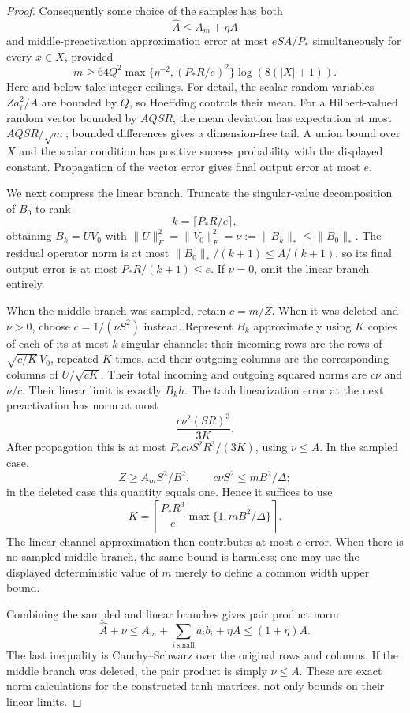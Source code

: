 \begin{proof}
Consequently some choice of the samples has both
\[
 \widehat A\le A_m+\eta A
\]
and middle-preactivation approximation error at most $eSA/P_*$
simultaneously for every $x\in X$, provided
\[
 m\ge64Q^2\max\{\eta^{-2},(P_*R/e)^2\}
                       \log(8(|X|+1)).
\]
Here and below take integer ceilings. For detail, the scalar random
variables $Za_i^2/A$ are bounded by $Q$, so Hoeffding controls their
mean. For a Hilbert-valued random vector bounded by $AQSR$, the mean
deviation has expectation at most $AQSR/\sqrt m$; bounded differences
gives a dimension-free tail. A union bound over $X$ and the scalar
condition has positive success probability with the displayed constant.
Propagation of the vector error gives final output error at most $e$.

We next compress the linear branch. Truncate the singular-value
decomposition of $B_0$ to rank
\[
 k=\lceil P_*R/e\rceil,
\]
obtaining $B_k=UV_0$ with
$\|U\|_F^2=\|V_0\|_F^2=\nu:=\|B_k\|_*\le\|B_0\|_*$.
The residual operator norm is at most $\|B_0\|_* /(k+1)\le A/(k+1)$,
so its final output error is at most $P_*R/(k+1)\le e$.
If $\nu=0$, omit the linear branch entirely.

When the middle branch was sampled, retain $c=m/Z$. When it was
deleted and $\nu>0$, choose $c=1/(\nu S^2)$ instead.
Represent $B_k$ approximately using $K$ copies of each of its at most
$k$ singular channels: their incoming rows are the rows of
$\sqrt{c/K}\,V_0$, repeated $K$ times, and their outgoing columns are
the corresponding columns of $U/\sqrt{cK}$.
Their total incoming and outgoing squared norms are $c\nu$ and
$\nu/c$. Their linear limit is exactly $B_kh$.
The tanh linearization error at the next preactivation has norm at most
\[
 \frac{c\nu^2(SR)^3}{3K}.
\]
After propagation this is at most
$P_*c\nu S^2R^3/(3K)$, using $\nu\le A$.
In the sampled case,
\[
 Z\ge A_mS^2/B^2,
 \qquad c\nu S^2\le mB^2/\Delta;
\]
in the deleted case this quantity equals one. Hence it suffices to use
\[
 K=\left\lceil\frac{P_*R^3}{e}
                   \max\{1,mB^2/\Delta\}\right\rceil.
\]
The linear-channel approximation then contributes at most $e$ error.
When there is no sampled middle branch, the same bound is harmless;
one may use the displayed deterministic value of $m$ merely to define
a common width upper bound.

Combining the sampled and linear branches gives pair product norm
\[
 \widehat A+\nu
 \le A_m+\sum_{i\ \mathrm{small}}a_ib_i+\eta A
 \le(1+\eta)A.
\]
The last inequality is Cauchy--Schwarz over the original rows and
columns. If the middle branch was deleted, the pair product is simply
$\nu\le A$. These are exact norm calculations for the constructed
tanh matrices, not only bounds on their linear limits.


\end{proof}
